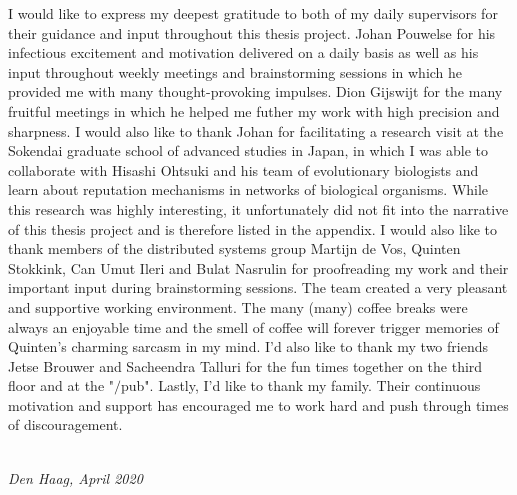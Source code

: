 \noindent{}I would like to express my deepest gratitude to both of my daily supervisors for their guidance and input throughout this thesis project. Johan Pouwelse for his infectious excitement and motivation delivered on a daily basis as well as his input throughout weekly meetings and brainstorming sessions in which he provided me with many thought-provoking impulses. Dion Gijswijt for the many fruitful meetings in which he helped me futher my work with high precision and sharpness. I would also like to thank Johan for facilitating a research visit at the Sokendai graduate school of advanced studies in Japan, in which I was able to collaborate with Hisashi Ohtsuki and his team of evolutionary biologists and learn about reputation mechanisms in networks of biological organisms. While this research was highly interesting, it unfortunately did not fit into the narrative of this thesis project and is therefore listed in the appendix. I would also like to thank members of the distributed systems group Martijn de Vos, Quinten Stokkink, Can Umut Ileri and Bulat Nasrulin for proofreading my work and their important input during brainstorming sessions. The team created a very pleasant and supportive working environment. The many (many) coffee breaks were always an enjoyable time and the smell of coffee will forever trigger memories of Quinten's charming sarcasm in my mind. I'd also like to thank my two friends Jetse Brouwer and Sacheendra Talluri for the fun times together on the third floor and at the "$/$pub". Lastly, I'd like to thank my family. Their continuous motivation and support has encouraged me to work hard and push through times of discouragement. \vspace{1em}\\



\begin{flushright}
{\makeatletter\itshape
    \@author \\
    Den Haag, April 2020
\makeatother}
\end{flushright}

